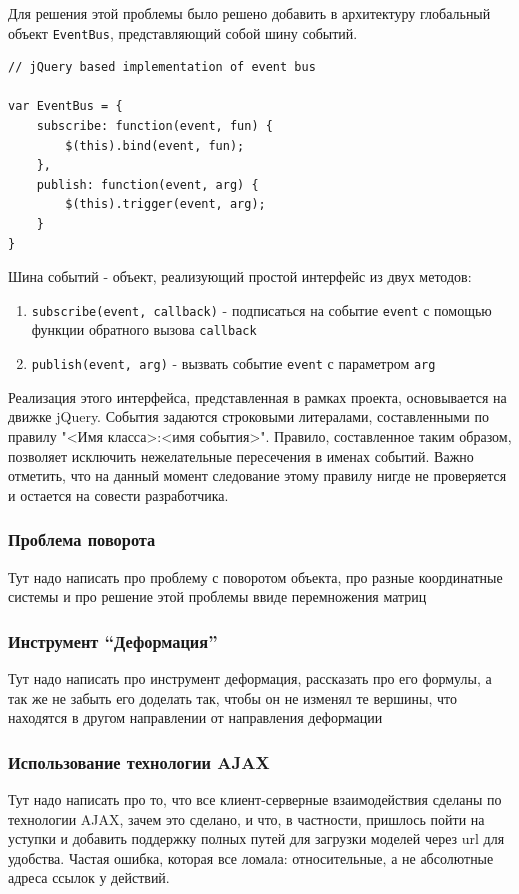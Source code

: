 \documentclass[12pt, a4paper]{article}
\begin{document}
Для решения этой проблемы было решено добавить в архитектуру глобальный объект
\texttt{EventBus}, представляющий собой шину событий.

\begin{lstlisting}
// jQuery based implementation of event bus

var EventBus = {
    subscribe: function(event, fun) {
        $(this).bind(event, fun);
    },
    publish: function(event, arg) {
        $(this).trigger(event, arg);
    }
}
\end{lstlisting}

Шина событий - объект, реализующий простой интерфейс из двух методов:
\begin{enumerate}
    \item \texttt{subscribe(event, callback)} - подписаться на событие
    \texttt{event} с помощью функции обратного вызова \texttt{callback}
    \item \texttt{publish(event, arg)} - вызвать событие
    \texttt{event} с параметром \texttt{arg}
\end{enumerate}

Реализация этого интерфейса, представленная в рамках проекта, основывается на
движке jQuery. События задаются строковыми литералами, составленными по правилу
"<Имя класса>:<имя события>". Правило, составленное таким образом, позволяет
исключить нежелательные пересечения в именах событий. Важно отметить, что на
данный момент следование этому правилу нигде не проверяется и остается на
совести разработчика.

\subsubsection{Проблема поворота}
Тут надо написать про проблему с поворотом объекта, про разные
координатные системы и про решение этой проблемы ввиде перемножения
матриц
\subsubsection{Инструмент ``Деформация''}
Тут надо написать про инструмент деформация, рассказать про его формулы,
а так же не забыть его доделать так, чтобы он не изменял те вершины, что
находятся в другом направлении от направления деформации
\subsubsection{Использование технологии AJAX}
Тут надо написать про то, что все клиент-серверные взаимодействия сделаны по
технологии AJAX, зачем это сделано, и что, в частности, пришлось пойти на
уступки и добавить поддержку полных путей для загрузки моделей через url для
удобства. Частая ошибка, которая все ломала: относительные, а не абсолютные
адреса ссылок у действий.
\end{document}
